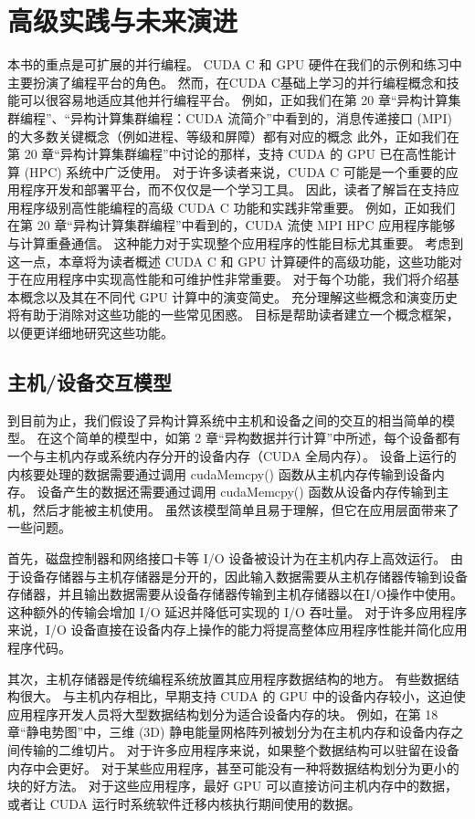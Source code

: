 \section{高级实践与未来演进}
本书的重点是可扩展的并行编程。 CUDA C 和 GPU 硬件在我们的示例和练习中主要扮演了编程平台的角色。 然而，在CUDA C基础上学习的并行编程概念和技能可以很容易地适应其他并行编程平台。 例如，正如我们在第 20 章“异构计算集群编程”、“异构计算集群编程：CUDA 流简介”中看到的，消息传递接口 (MPI) 的大多数关键概念（例如进程、等级和屏障）都有对应的概念 此外，正如我们在第 20 章“异构计算集群编程”中讨论的那样，支持 CUDA 的 GPU 已在高性能计算 (HPC) 系统中广泛使用。 对于许多读者来说，CUDA C 可能是一个重要的应用程序开发和部署平台，而不仅仅是一个学习工具。 因此，读者了解旨在支持应用程序级别高性能编程的高级 CUDA C 功能和实践非常重要。 例如，正如我们在第 20 章“异构计算集群编程”中看到的，CUDA 流使 MPI HPC 应用程序能够与计算重叠通信。 这种能力对于实现整个应用程序的性能目标尤其重要。 考虑到这一点，本章将为读者概述 CUDA C 和 GPU 计算硬件的高级功能，这些功能对于在应用程序中实现高性能和可维护性非常重要。 对于每个功能，我们将介绍基本概念以及其在不同代 GPU 计算中的演变简史。 充分理解这些概念和演变历史将有助于消除对这些功能的一些常见困惑。 目标是帮助读者建立一个概念框架，以便更详细地研究这些功能。

\subsection{主机/设备交互模型}
到目前为止，我们假设了异构计算系统中主机和设备之间的交互的相当简单的模型。 在这个简单的模型中，如第 2 章“异构数据并行计算”中所述，每个设备都有一个与主机内存或系统内存分开的设备内存（CUDA 全局内存）。 设备上运行的内核要处理的数据需要通过调用 cudaMemcpy() 函数从主机内存传输到设备内存。 设备产生的数据还需要通过调用 cudaMemcpy() 函数从设备内存传输到主机，然后才能被主机使用。 虽然该模型简单且易于理解，但它在应用层面带来了一些问题。

首先，磁盘控制器和网络接口卡等 I/O 设备被设计为在主机内存上高效运行。 由于设备存储器与主机存储器是分开的，因此输入数据需要从主机存储器传输到设备存储器，并且输出数据需要从设备存储器传输到主机存储器以在I/O操作中使用。 这种额外的传输会增加 I/O 延迟并降低可实现的 I/O 吞吐量。 对于许多应用程序来说，I/O 设备直接在设备内存上操作的能力将提高整体应用程序性能并简化应用程序代码。

其次，主机存储器是传统编程系统放置其应用程序数据结构的地方。 有些数据结构很大。 与主机内存相比，早期支持 CUDA 的 GPU 中的设备内存较小，这迫使应用程序开发人员将大型数据结构划分为适合设备内存的块。 例如，在第 18 章“静电势图”中，三维 (3D) 静电能量网格阵列被划分为在主机内存和设备内存之间传输的二维切片。 对于许多应用程序来说，如果整个数据结构可以驻留在设备内存中会更好。 对于某些应用程序，甚至可能没有一种将数据结构划分为更小的块的好方法。 对于这些应用程序，最好 GPU 可以直接访问主机内存中的数据，或者让 CUDA 运行时系统软件迁移内核执行期间使用的数据。

